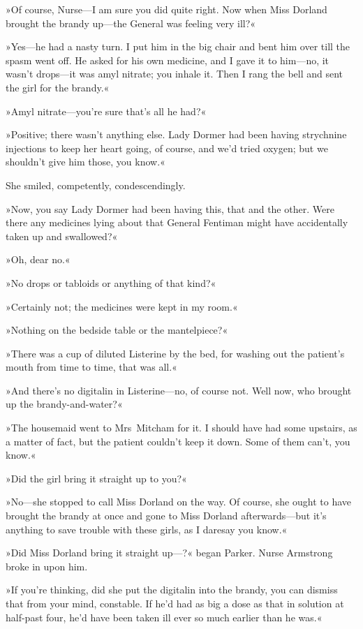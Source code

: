 »Of course, Nurse—I am sure you did quite right. Now when Miss Dorland brought the brandy up—the General was feeling very ill?«

»Yes—he had a nasty turn. I put him in the big chair and bent him over till the spasm went off. He asked for his own medicine, and I gave it to him—no, it wasn't drops—it was amyl nitrate; you inhale it. Then I rang the bell and sent the girl for the brandy.«

»Amyl nitrate—you're sure that's all he had?«

»Positive; there wasn't anything else. Lady Dormer had been having strychnine injections to keep her heart going, of course, and we'd tried oxygen; but we shouldn't give him those, you know.«

She smiled, competently, condescendingly.

»Now, you say Lady Dormer had been having this, that and the other. Were there any medicines lying about that General Fentiman might have accidentally taken up and swallowed?«

»Oh, dear no.«

»No drops or tabloids or anything of that kind?«

»Certainly not; the medicines were kept in my room.«

»Nothing on the bedside table or the mantelpiece?«

»There was a cup of diluted Listerine by the bed, for washing out the patient's mouth from time to time, that was all.«

»And there's no digitalin in Listerine—no, of course not. Well now, who brought up the brandy-and-water?«

»The housemaid went to Mrs~Mitcham for it. I should have had some upstairs, as a matter of fact, but the patient couldn't keep it down. Some of them can't, you know.«

»Did the girl bring it straight up to you?«

»No—she stopped to call Miss Dorland on the way. Of course, she ought to have brought the brandy at once and gone to Miss Dorland afterwards—but it's anything to save trouble with these girls, as I daresay you know.«

»Did Miss Dorland bring it straight up—?« began Parker. Nurse Armstrong broke in upon him.

»If you're thinking, did she put the digitalin into the brandy, you can dismiss that from your mind, constable. If he'd had as big a dose as that in solution at half-past four, he'd have been taken ill ever so much earlier than he was.«

